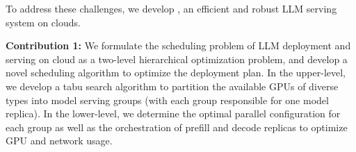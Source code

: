

%  
 
To address these challenges, we develop \sys, an efficient and robust LLM serving system on clouds. 

\textbf{Contribution 1:} We formulate the scheduling problem of LLM deployment and serving on cloud as a two-level hierarchical optimization problem, and develop a novel scheduling algorithm to optimize the deployment plan. 
In the upper-level, we develop a tabu search algorithm to partition the available GPUs of diverse types into model serving groups (with each group responsible for one model replica). In the lower-level, we determine the optimal parallel configuration for each group as well as the orchestration of prefill and decode replicas to optimize GPU and network usage.


